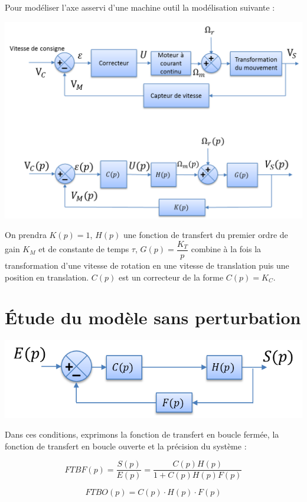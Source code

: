 \documentclass[10pt,oneside]{article}
\begin{document}
\begin{exemple}
Pour modéliser l'axe asservi d'une machine outil la modélisation suivante :
\begin{center}
\includegraphics[width=.6\textwidth]{png/bloc2}
\end{center}
On prendra $K(p)=1$, $H(p)$ une fonction de transfert du premier ordre de gain $K_M$ et de constante de temps $\tau$, $G(p)=\dfrac{K_T}{p}$ combine à la fois la transformation d'une vitesse de rotation en une vitesse de translation puis une position en translation. $C(p)$ est un correcteur de la forme $C(p)=K_C$.
\end{exemple}


\section{Étude du modèle sans perturbation}


\begin{minipage}[c]{.48\linewidth}
\begin{center}
\includegraphics[width=.95\textwidth]{png/bloc11}
\end{center}
\end{minipage}\hfill
\begin{minipage}[c]{.48\linewidth}
Dans ces conditions, exprimons la fonction de transfert en boucle fermée, la fonction de transfert en boucle ouverte et la précision du système :

$$
FTBF(p)
=\dfrac{S(p)}{E(p)}
=\dfrac{C(p)H(p)}{1+C(p)H(p)F(p)}
$$

\end{minipage}


$$
FTBO(p) = C(p) \cdot H(p) \cdot F(p)
$$
\end{document}
